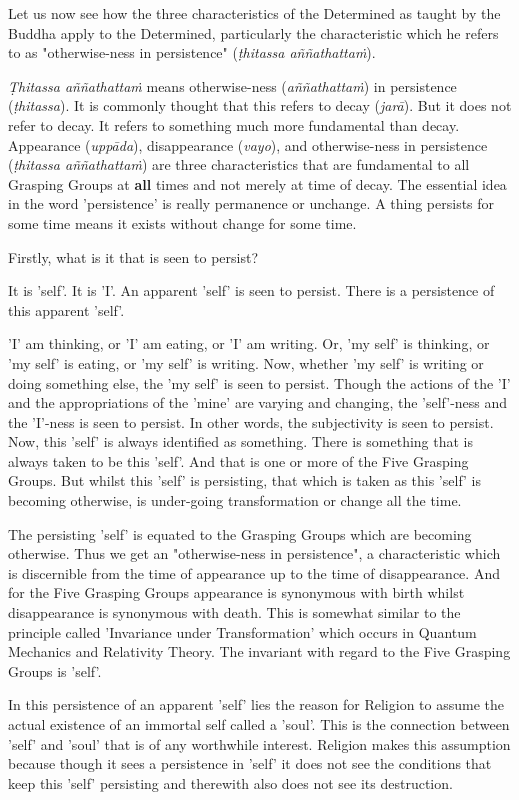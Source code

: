 Let us now see how the three characteristics of the Determined as
taught by the Buddha apply to the Determined, particularly the
characteristic which he refers to as "otherwise-ness in persistence"
(\emph{ṭhitassa aññathattaṁ}).


\emph{Ṭhitassa aññathattaṁ} means otherwise-ness (\emph{aññathattaṁ}) in
persistence (\emph{ṭhitassa}). It is commonly thought that this refers to
decay (\emph{jarā}). But it does not refer to decay. It refers to something
much more fundamental than decay. Appearance (\emph{uppāda}), disappearance
(\emph{vayo}), and otherwise-ness in persistence (\emph{ṭhitassa aññathattaṁ})
are three characteristics that are fundamental to all Grasping Groups at
\textbf{all} times and not merely at time of decay. The essential idea in the
word 'persistence' is really permanence or unchange. A thing persists
for some time means it exists without change for some time.


Firstly, what is it that is seen to persist?


It is 'self'. It is 'I'. An apparent 'self' is seen to persist. There is
a persistence of this apparent 'self'.


'I' am thinking, or 'I' am eating, or 'I' am writing. Or, 'my self' is
thinking, or 'my self' is eating, or 'my self' is writing. Now, whether
'my self' is writing or doing something else, the 'my self' is seen to
persist. Though the actions of the 'I' and the appropriations of the
'mine' are varying and changing, the 'self'-ness and the 'I'-ness is
seen to persist. In other words, the subjectivity is seen to persist.
Now, this 'self' is always identified as something. There is something
that is always taken to be this 'self'. And that is one or more of the
Five Grasping Groups. But whilst this 'self' is persisting, that which
is taken as this 'self' is becoming otherwise, is under-going
transformation or change all the time.


The persisting 'self' is equated to the Grasping Groups which are
becoming otherwise. Thus we get an "otherwise-ness in persistence", a
characteristic which is discernible from the time of appearance up to
the time of disappearance. And for the Five Grasping Groups appearance
is synonymous with birth whilst disappearance is synonymous with death.
This is somewhat similar to the principle called 'Invariance under
Transformation' which occurs in Quantum Mechanics and Relativity Theory.
The invariant with regard to the Five Grasping Groups is 'self'.


In this persistence of an apparent 'self' lies the reason for Religion
to assume the actual existence of an immortal self called a 'soul'. This
is the connection between 'self' and 'soul' that is of any worthwhile
interest. Religion makes this assumption because though it sees a
persistence in 'self' it does not see the conditions that keep this
'self' persisting and therewith also does not see its destruction.



